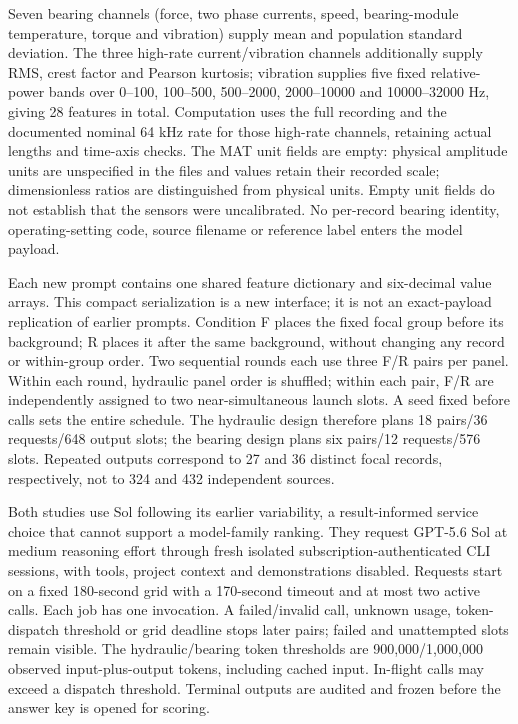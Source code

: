 \documentclass[11pt,a4paper]{article}
\begin{document}
Seven bearing channels (force, two phase currents, speed, bearing-module temperature, torque and vibration) supply mean and population standard deviation. The three high-rate current/vibration channels additionally supply RMS, crest factor and Pearson kurtosis; vibration supplies five fixed relative-power bands over 0--100, 100--500, 500--2000, 2000--10000 and 10000--32000 Hz, giving 28 features in total. Computation uses the full recording and the documented nominal 64 kHz rate for those high-rate channels, retaining actual lengths and time-axis checks. The MAT unit fields are empty: physical amplitude units are unspecified in the files and values retain their recorded scale; dimensionless ratios are distinguished from physical units. Empty unit fields do not establish that the sensors were uncalibrated. No per-record bearing identity, operating-setting code, source filename or reference label enters the model payload.

Each new prompt contains one shared feature dictionary and six-decimal value arrays. This compact serialization is a new interface; it is not an exact-payload replication of earlier prompts. Condition F places the fixed focal group before its background; R places it after the same background, without changing any record or within-group order. Two sequential rounds each use three F/R pairs per panel. Within each round, hydraulic panel order is shuffled; within each pair, F/R are independently assigned to two near-simultaneous launch slots. A seed fixed before calls sets the entire schedule. The hydraulic design therefore plans 18 pairs/36 requests/648 output slots; the bearing design plans six pairs/12 requests/576 slots. Repeated outputs correspond to 27 and 36 distinct focal records, respectively, not to 324 and 432 independent sources.

Both studies use Sol following its earlier variability, a result-informed service choice that cannot support a model-family ranking. They request GPT-5.6 Sol at medium reasoning effort through fresh isolated subscription-authenticated CLI sessions, with tools, project context and demonstrations disabled. Requests start on a fixed 180-second grid with a 170-second timeout and at most two active calls. Each job has one invocation. A failed/invalid call, unknown usage, token-dispatch threshold or grid deadline stops later pairs; failed and unattempted slots remain visible. The hydraulic/bearing token thresholds are 900,000/1,000,000 observed input-plus-output tokens, including cached input. In-flight calls may exceed a dispatch threshold. Terminal outputs are audited and frozen before the answer key is opened for scoring.
\end{document}
